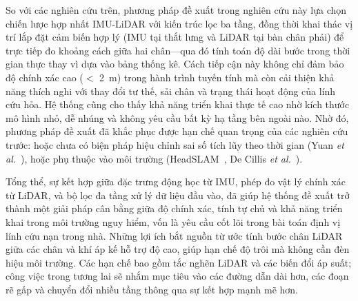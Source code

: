So với các nghiên cứu trên, phương pháp đề xuất trong nghiên cứu này lựa chọn chiến lược hợp nhất IMU-LiDAR với kiến trúc lọc ba tầng, đồng thời khai thác vị trí lắp đặt cảm biến hợp lý (IMU tại thắt lưng và LiDAR tại bàn chân phải) để trực tiếp đo khoảng cách giữa hai chân—qua đó tính toán độ dài bước trong thời gian thực thay vì dựa vào bảng thống kê. Cách tiếp cận này không chỉ đảm bảo độ chính xác cao ($<$ 2~m) trong hành trình tuyến tính mà còn cải thiện khả năng thích nghi với thay đổi tư thế, sải chân và trạng thái hoạt động của lính cứu hỏa. Hệ thống cũng cho thấy khả năng triển khai thực tế cao nhờ kích thước mô hình nhỏ, dễ nhúng và không yêu cầu bất kỳ hạ tầng bên ngoài nào. Nhờ đó, phương pháp đề xuất đã khắc phục được hạn chế quan trọng của các nghiên cứu trước: hoặc chưa có biện pháp hiệu chỉnh sai số tích lũy theo thời gian (Yuan \textit{et al.}~\cite{yuan2016research}), hoặc phụ thuộc vào môi trường (HeadSLAM~\cite{cinaz2008headslam}, De Cillis \textit{et al.}~\cite{de2017hybrid}).

Tổng thể, sự kết hợp giữa đặc trưng động học từ IMU, phép đo vật lý chính xác từ LiDAR, và bộ lọc đa tầng xử lý dữ liệu đầu vào, đã giúp hệ thống đề xuất trở thành một giải pháp cân bằng giữa độ chính xác, tính tự chủ và khả năng triển khai trong môi trường nguy hiểm, vốn là yêu cầu cốt lõi trong bài toán định vị lính cứu nạn trong nhà. Những lợi ích bắt nguồn từ ước tính bước chân LiDAR giữa các chân và khí áp kế hỗ trợ độ cao, giúp hạn chế độ trôi mà không cần đèn hiệu môi trường. Các hạn chế bao gồm tắc nghẽn LiDAR và các biến đổi áp suất; công việc trong tương lai sẽ nhắm mục tiêu vào các đường dẫn dài hơn, các đoạn rẽ gấp và chuyển đổi nhiều tầng thông qua sự kết hợp mạnh mẽ hơn.
